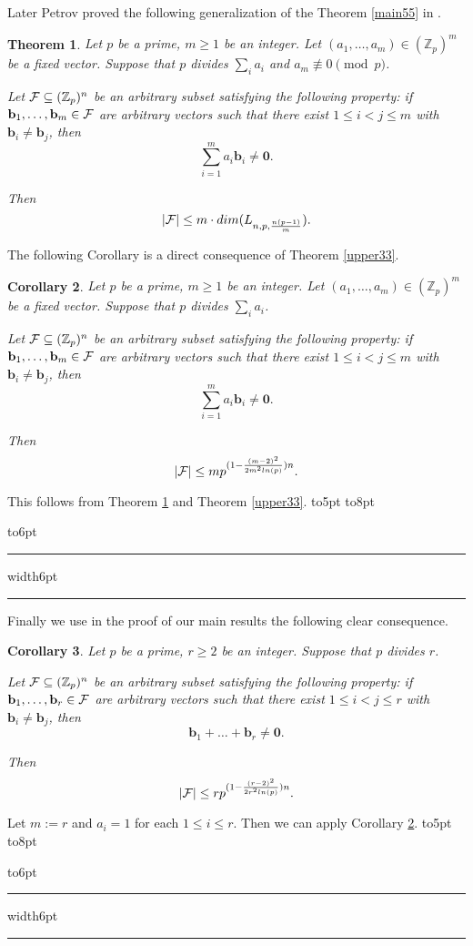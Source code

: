 \documentclass[12pt]{article}
\newtheorem{thm}{Theorem}[section]
\newtheorem{cor}[thm]{Corollary}
\newcommand{\proof
}{\par\medskip\noindent {\bf Proof.\ \ }}
\newcommand{\openbox}{\leavevmode
  \hbox to8pt{\hfil\vrule\vbox to6pt{\hrule width6pt\vfil\hrule}\vrule}}
\newcommand{\qed}{\hbox to5pt{ } \hfill \openbox\bigskip\medskip}
\newcommand{\Zp}{\mathbb Z _p}
\newcommand{\cF}{\mbox{$\cal F$}}
\newcommand{\ve}[1]{\mathbf{#1}}
\begin{document}
Later Petrov proved the following generalization of the  Theorem  \ref{main55} in \cite{P}. 
\begin{thm} \label{main4}
Let $p$ be a prime, $m\geq 1$ be an integer.
Let $(a_1,\ldots ,a_m)\in ({\Zp})^m$ be  a fixed vector. Suppose that 
$p$ divides $\sum_i a_i$ and  $a_m\not\equiv 0 \pmod p$.

Let $\cF\subseteq ({\Zp})^n$ be an arbitrary subset satisfying the following property:  if $\ve b_1, \ldots, \ve b_m\in {\cF}$ are arbitrary vectors such that 
there exist $1\leq i<j\leq m$ with $\ve b_i\ne \ve b_j$, then
$$
\sum_{i=1}^m a_i\ve b_i \ne \ve 0.
$$

Then 
$$
|\cF|\leq m \cdot dim(L_{n,p,\frac{n(p-1)}{m}}).
$$
\end{thm}

The following Corollary is a direct consequence of Theorem \ref{upper33}.
\begin{cor} \label{main5}
Let $p$ be a prime, $m\geq 1$ be an integer.
Let $(a_1,\ldots ,a_m)\in ({\Zp})^m$ be  a fixed vector. Suppose that 
$p$ divides $\sum_i a_i$. 

Let $\cF\subseteq ({\Zp})^n$ be an arbitrary subset satisfying the following property:  if $\ve b_1, \ldots, \ve b_m\in {\cF}$ are arbitrary vectors such that 
there exist $1\leq i<j\leq m$ with $\ve b_i\ne \ve b_j$, then
$$
\sum_{i=1}^m a_i\ve b_i \ne \ve 0.
$$

Then 
$$
|\cF|\leq mp^{(1-\frac{(m-2)^2}{2 m^2ln(p)})n}.
$$
\end{cor}
\proof 
This follows from Theorem \ref{main4} and Theorem \ref{upper33}. \qed
Finally we use in the proof of our main results the following clear consequence. 

\begin{cor} \label{main7}
Let $p$ be a prime, $r\geq 2$ be an integer. Suppose that 
$p$ divides $r$. 

Let $\cF\subseteq ({\Zp})^n$ be an arbitrary subset satisfying the following property:  if $\ve b_1, \ldots, \ve b_r\in {\cF}$ are arbitrary vectors such that 
there exist $1\leq i<j\leq r$ with $\ve b_i\ne \ve b_j$, then
$$
\ve b_1+ \ldots +\ve b_r \ne \ve 0.
$$

Then 
$$
|\cF|\leq rp^{(1-\frac{(r-2)^2}{2 r^2ln(p)})n}.
$$
\end{cor}
\proof 
Let $m:=r$ and $a_i=1$ for each $1\leq i\leq r$. Then we
can apply Corollary \ref{main5}.
\qed
\end{document}
